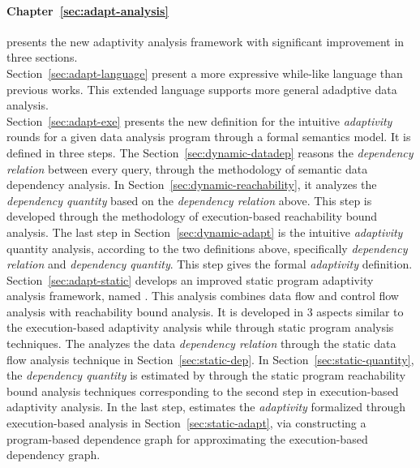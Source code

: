 \begin{enumerate}
    \paragraph*{Chapter~\ref{sec:adapt-analysis}} presents the new adaptivity analysis framework with significant improvement in three sections.
    \\
    Section~\ref{sec:adapt-language} present a more expressive while-like language than previous works. This extended language supports more general adadptive data analysis.
    \\
    Section~\ref{sec:adapt-exe} presents the new definition for
    the intuitive \emph{adaptivity} rounds for a given data analysis program through a formal semantics model.
    It is defined in three steps. 
    The Section~\ref{sec:dynamic-datadep} reasons the \emph{dependency relation} between every query, 
    through the methodology of semantic data dependency analysis.
    In Section~\ref{sec:dynamic-reachability}, it analyzes the \emph{dependency quantity} 
    based on the \emph{dependency relation} above.
    This step is developed through the methodology of execution-based reachability bound analysis.
    The last step in Section~\ref{sec:dynamic-adapt} is the intuitive \emph{adaptivity} quantity analysis, 
   according to the two definitions above, specifically \emph{dependency relation} and \emph{dependency quantity}.
    This step 
    gives the formal \emph{adaptivity} definition. 
    \\
    Section~\ref{sec:adapt-static} develops an improved static program adaptivity analysis framework, named {\THESYSTEM}.
    This analysis combines data flow and control flow analysis with reachability bound analysis.
    It is developed in 3 aspects similar to the execution-based adaptivity analysis 
    while through static program analysis techniques. 
    The {\THESYSTEM} analyzes the data \emph{dependency relation} through the static data flow analysis technique
    in Section~\ref{sec:static-dep}.
    In Section~\ref{sec:static-quantity}, the \emph{dependency quantity} 
    is estimated by {\THESYSTEM} through the static program reachability bound analysis techniques corresponding to the second step in execution-based adaptivity analysis.
    In the last step, {\THESYSTEM}
    estimates the \emph{adaptivity} formalized through execution-based analysis in Section~\ref{sec:static-adapt},
    via constructing a program-based dependence graph for approximating the execution-based dependency graph.
    


\end{enumerate}
